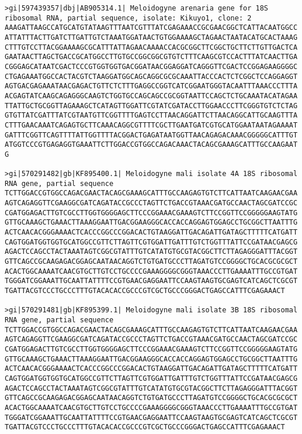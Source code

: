 \documentclass[11pt]{article}
\begin{document}
\begin{Verbatim}[commandchars=\\\{\}]
>gi|597439357|dbj|AB905314.1| Meloidogyne arenaria gene for 18S ribosomal RNA, partial sequence, isolate: Kikuyo1, clone: 2
AAAGATTAAGCCATGCATGTATAAGTTTAATCGTTTATCGAGAAACCGCGAACGGCTCATTACAATGGCC
ATTATTTACTTGATCTTGATTGTCTAAATGGATAACTGTGGAAAAGCTAGAACTAATACATGCACTAAAG
CTTTGTCCTTACGGAAAAGCGCATTTATTAGAACAAAACCACGCGGCTTCGGCTGCTTCTTGTTGACTCA
GAATAACTTAGCTGACCGCATGGCCTTGTGCCGGCGGCGTGTCTTTCAAGCGTCCACTTTATCAACTTGA
CGGGAGCATAATCGACTCCCGTGGTGGTGACGGATAACGGAGGATCAGGGTTCGACTCCGGAGAAGGGGC
CTGAGAAATGGCCACTACGTCTAAGGATGGCAGCAGGCGCGCAAATTACCCACTCTCGGCTCCAGGAGGT
AGTGACGAGAAATAACGAGACTGTTCTCTTTGAGGCCGGTCATCGGAATGGGTACAATTTAAACCCTTTA
ACGAGTATCAAGCAGAGGGCAAGTCTGGTGCCAGCAGCCGCGGTAATTCCAGCTCTGCAAATACATAGAA
TTATTGCTGCGGTTAGAAAGCTCATAGTTGGATTCGTATCGATACCTTGGAACCCTTCGGGTGTCTCTAG
GTGTTATCGATTTATCGTAATGTTCGGTTTTGAGTCCTTAACAGGATTCTTAACAGGCATTGCAAGTTTA
CTTTGAACAAATCAGAGTGCTTCAAACAGGCGTTTTCGCTTGAATGATCGTGCATGGAATAATAGAAAAT
GATTTCGGTTCAGTTTTATTGGTTTTACGGACTGAGATAATGGTTAACAGAGACAAACGGGGGCATTTGT
ATGGTCCCGTGAGAGGTGAAATTCTTGGACCGTGGCCAGACAAACTACAGCGAAAGCATTTGCCAAGAAT
G

>gi|570291482|gb|KF895400.1| Meloidogyne mali isolate 4A 18S ribosomal RNA gene, partial sequence
TCTTGGACCGTGGCCAGACGAACTACAGCGAAAGCATTTGCCAAGAGTGTCTTCATTAATCAAGAACGAA
AGTCAGAGGTTCGAAGGCGATCAGATACCGCCCTAGTTCTGACCGTAAACGATGCCAACTAGCGATCCGC
CGATGGAGACTTGTCGCCTTGGTGGGGAGCTTCCCGGAAACGAAAGTCTTCCGGTTCCGGGGGAAGTATG
GTTGCAAAGCTGAAACTTAAAGGAATTGACGGAAGGGCACCACCAGGAGTGGAGCCTGCGGCTTAATTTG
ACTCAACACGGGAAAACTCACCCGGCCCGGACACTGTAAGGATTGACAGATTGATAGCTTTTTCATGATT
CAGTGGATGGTGGTGCATGGCCGTTCTTAGTTCGTGGATTGATTTGTCTGGTTTATTCCGATAACGAGCG
AGACTCCAGCCTACTAAATAGTCGGCGTATTTGTCATATGTGCGTACGGCTTCTTAGAGGGATTTACGGT
GTTCAGCCGCAAGAGACGGAGCAATAACAGGTCTGTGATGCCCTTAGATGTCCGGGGCTGCACGCGCGCT
ACACTGGCAAAATCAACGTGCTTGTCCTGCCCCGAAAGGGGCGGGTAAACCCTTGAAAATTTGCCGTGAT
TGGGATCGGAAATTGCAATTATTTTCCGTGAACGAGGAATTCCAAGTAAGTGCGAGTCATCAGCTCGCGT
TGATTACGTCCCTGCCCTTTGTACACACCGCCCGTCGCTGCCCGGGACTGAGCCATTTCGAGAAACT

>gi|570291481|gb|KF895399.1| Meloidogyne mali isolate 3B 18S ribosomal RNA gene, partial sequence
TCTTGGACCGTGGCCAGACGAACTACAGCGAAAGCATTTGCCAAGAGTGTCTTCATTAATCAAGAACGAA
AGTCAGAGGTTCGAAGGCGATCAGATACCGCCCTAGTTCTGACCGTAAACGATGCCAACTAGCGATCCGC
CGATGGAGACTTGTCGCCTTGGTGGGGAGCTTCCCGGAAACGAAAGTCTTCCGGTTCCGGGGGAAGTATG
GTTGCAAAGCTGAAACTTAAAGGAATTGACGGAAGGGCACCACCAGGAGTGGAGCCTGCGGCTTAATTTG
ACTCAACACGGGAAAACTCACCCGGCCCGGACACTGTAAGGATTGACAGATTGATAGCTTTTTCATGATT
CAGTGGATGGTGGTGCATGGCCGTTCTTAGTTCGTGGATTGATTTGTCTGGTTTATTCCGATAACGAGCG
AGACTCCAGCCTACTAAATAGTCGGCGTATTTGTCATATGTGCGTACGGCTTCTTAGAGGGATTTACGGT
GTTCAGCCGCAAGAGACGGAGCAATAACAGGTCTGTGATGCCCTTAGATGTCCGGGGCTGCACGCGCGCT
ACACTGGCAAAATCAACGTGCTTGTCCTGCCCCGAAAGGGGCGGGTAAACCCTTGAAAATTTGCCGTGAT
TGGGATCGGAAATTGCAATTATTTTCCGTGAACGAGGAATTCCAAGTAAGTGCGAGTCATCAGCTCGCGT
TGATTACGTCCCTGCCCTTTGTACACACCGCCCGTCGCTGCCCGGGACTGAGCCATTTCGAGAAACT


\end{Verbatim}
\end{document}
